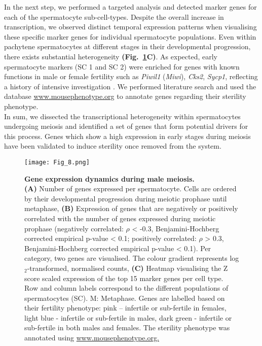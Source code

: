 In the next step, we performed a targeted analysis and detected marker genes for each of the spermatocyte sub-cell-types. Despite the overall increase in transcription, we observed distinct temporal expression patterns when visualising these specific marker genes for individual spermatocyte populations. Even within pachytene spermatocytes at different stages in their developmental progression, there exists substantial heterogeneity \textbf{(Fig.~\ref{fig3:meiosis}C)}. As expected, early spermatocyte markers (SC 1 and SC 2) were enriched for genes with known functions in male or female fertility such as \textit{Piwil1} (\textit{Miwi}), \textit{Cks2}, \textit{Sycp1}, reflecting a history of intensive investigation \citep{Deng2002, Spruck2003, Vries2005}. We performed literature search and used the database \url{www.mousephenotype.org} to annotate genes regarding their sterility phenotype. \\

In sum, we dissected the transcriptional heterogeneity within spermatocytes undergoing meiosis and identified a set of genes that form potential drivers for this process. Genes which show a high expression in early stages during meiosis have been validated to induce sterility once removed from the system.  

\newpage

\begin{figure}[!h]
\centering
\texttt{[image: Fig\_8.png]}
\caption[Gene expression dynamics during male meiosis]{\textbf{Gene expression dynamics during male meiosis.} \\
\textbf{(A)} Number of genes expressed per spermatocyte. Cells are ordered by their developmental progression during meiotic prophase until metaphase, \textbf{(B)} Expression of genes that are negatively or positively correlated with the number of genes expressed during meiotic prophase (negatively correlated: $\rho$ < -0.3, Benjamini-Hochberg corrected empirical p-value < 0.1; positively correlated: $\rho$ > 0.3, Benjamini-Hochberg corrected empirical p-value < 0.1). Per category, two genes are visualised. The colour gradient represents log$_2$-transformed, normalised counts, \textbf{(C)} Heatmap visualising the Z score scaled expression of the top 15 marker genes per cell type. Row and column labels correspond to the different populations of spermatocytes (SC). M: Metaphase. Genes are labelled based on their fertility phenotype: pink – infertile or sub-fertile in females, light blue - infertile or sub-fertile in males, dark green - infertile or sub-fertile in both males and females. The sterility phenotype was annotated using \url{www.mousephenotype.org.}}
\label{fig3:meiosis}
\end{figure}

